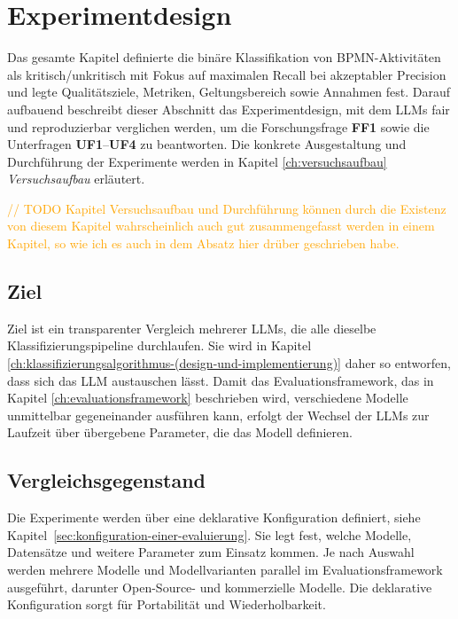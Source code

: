 \section{Experimentdesign}\label{sec:experimentdesign}

Das gesamte Kapitel definierte die binäre Klassifikation von \ac{BPMN}-Aktivitäten als kritisch/unkritisch mit Fokus auf maximalen Recall bei akzeptabler Precision und legte Qualitätsziele, Metriken, Geltungsbereich sowie Annahmen fest. Darauf aufbauend beschreibt dieser Abschnitt das Experimentdesign, mit dem \acp{LLM} fair und reproduzierbar verglichen werden, um die Forschungsfrage \textbf{FF1} sowie die Unterfragen \textbf{UF1}–\textbf{UF4} zu beantworten. Die konkrete Ausgestaltung und Durchführung der Experimente werden in Kapitel \ref{ch:versuchsaufbau} \emph{Versuchsaufbau} erläutert.

\textcolor{orange}{// TODO Kapitel Versuchsaufbau und Durchführung können durch die Existenz von diesem Kapitel wahrscheinlich auch gut zusammengefasst werden in einem Kapitel, so wie ich es auch in dem Absatz hier drüber geschrieben habe.}

\subsection*{Ziel}

Ziel ist ein transparenter Vergleich mehrerer \acp{LLM}, die alle dieselbe Klassifizierungspipeline durchlaufen. Sie wird in Kapitel \ref{ch:klassifizierungsalgorithmus-(design-und-implementierung)} daher so entworfen, dass sich das \ac{LLM} austauschen lässt. Damit das Evaluationsframework, das in Kapitel \ref{ch:evaluationsframework} beschrieben wird, verschiedene Modelle unmittelbar gegeneinander ausführen kann, erfolgt der Wechsel der \acp{LLM} zur Laufzeit über übergebene Parameter, die das Modell definieren.

\subsection*{Vergleichsgegenstand}

Die Experimente werden über eine deklarative Konfiguration definiert, siehe Kapitel~\ref{sec:konfiguration-einer-evaluierung}. Sie legt fest, welche Modelle, Datensätze und weitere Parameter zum Einsatz kommen. Je nach Auswahl werden mehrere Modelle und Modellvarianten parallel im Evaluationsframework ausgeführt, darunter Open-Source- und kommerzielle Modelle. Die deklarative Konfiguration sorgt für Portabilität und Wiederholbarkeit.

